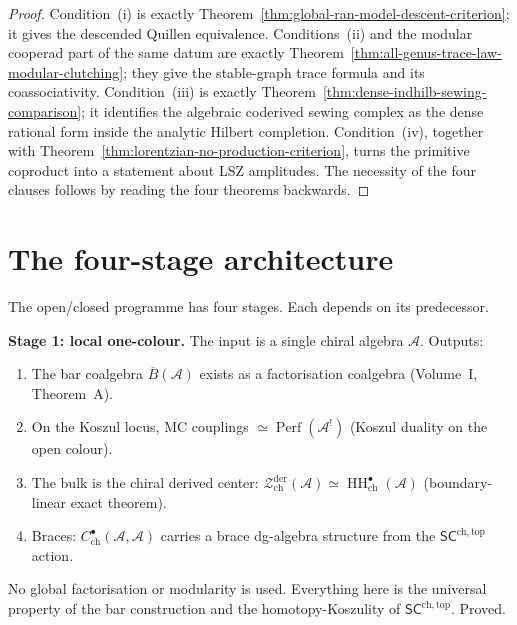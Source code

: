 \documentclass[11pt]{article}
\newcommand{\cA}{\mathcal{A}}
\newcommand{\cZ}{\mathcal{Z}}
\newcommand{\barB}{\overline{B}}
\newcommand{\SCchtop}{\mathsf{SC}^{\mathrm{ch,top}}}
\newcommand{\HH}{\operatorname{HH}}
\newcommand{\Perf}{\operatorname{Perf}}
\newcommand{\Zder}{\cZ^{\mathrm{der}}_{\mathrm{ch}}}
\begin{document}
\begin{proof}
Condition~(i) is exactly
Theorem~\ref{thm:global-ran-model-descent-criterion}; it gives the
descended Quillen equivalence.  Conditions~(ii) and the modular
cooperad part of the same datum are exactly
Theorem~\ref{thm:all-genus-trace-law-modular-clutching}; they give
the stable-graph trace formula and its coassociativity.  Condition~(iii)
is exactly Theorem~\ref{thm:dense-indhilb-sewing-comparison}; it
identifies the algebraic coderived sewing complex as the dense
rational form inside the analytic Hilbert completion.  Condition~(iv),
together with Theorem~\ref{thm:lorentzian-no-production-criterion},
turns the primitive coproduct into a statement about LSZ amplitudes.
The necessity of the four clauses follows by reading the four
theorems backwards.
\end{proof}


\section{The four-stage architecture}
\label{sec:four-stages}

The open/closed programme has four stages.  Each depends on its
predecessor.

\medskip

\noindent
\textbf{Stage 1: local one-colour.}
The input is a single chiral algebra $\cA$.  Outputs:

\begin{enumerate}[label=\textup{(\alph*)},nosep]
\item The bar coalgebra $\barB(\cA)$ exists as a factorisation
  coalgebra (Volume~I, Theorem~A).
\item On the Koszul locus, MC couplings
  $\simeq \Perf(\cA^!)$ (Koszul duality on the open colour).
\item The bulk is the chiral derived center:
  $\Zder(\cA) \simeq \HH^\bullet_{\mathrm{ch}}(\cA)$
  (boundary-linear exact theorem).
\item Braces: $C^\bullet_{\mathrm{ch}}(\cA, \cA)$ carries a brace
  dg-algebra structure from the $\SCchtop$ action.
\end{enumerate}

No global factorisation or modularity is used.  Everything here
is the universal property of the bar construction and the
homotopy-Koszulity of $\SCchtop$.  Proved.
\end{document}
